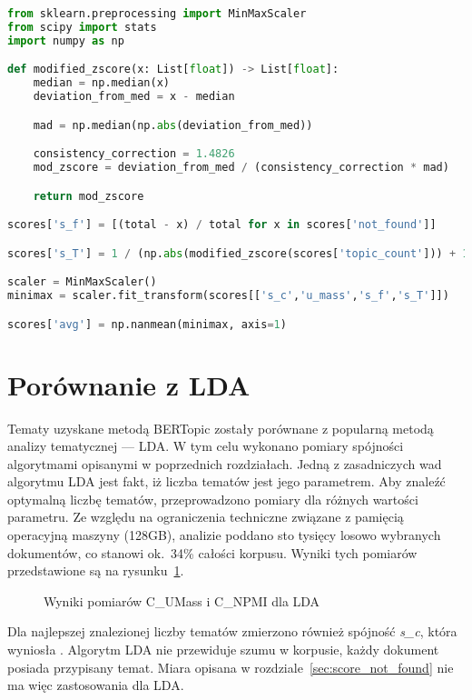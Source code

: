 		\begin{lstlisting}[label=lst:final_score,language=Python,caption=Obliczanie finalnej oceny spójności tematów dla listy modeli]
from sklearn.preprocessing import MinMaxScaler
from scipy import stats
import numpy as np

def modified_zscore(x: List[float]) -> List[float]:
	median = np.median(x)
	deviation_from_med = x - median

	mad = np.median(np.abs(deviation_from_med))

	consistency_correction = 1.4826
	mod_zscore = deviation_from_med / (consistency_correction * mad)

	return mod_zscore

scores['s_f'] = [(total - x) / total for x in scores['not_found']]

scores['s_T'] = 1 / (np.abs(modified_zscore(scores['topic_count'])) + 1)

scaler = MinMaxScaler()
minimax = scaler.fit_transform(scores[['s_c','u_mass','s_f','s_T']])

scores['avg'] = np.nanmean(minimax, axis=1)
		\end{lstlisting}

\section{Porównanie z LDA}
	Tematy uzyskane metodą BERTopic zostały porównane z popularną metodą analizy tematycznej --- LDA\@.
	W tym celu wykonano pomiary spójności algorytmami opisanymi w poprzednich rozdziałach.
	Jedną z zasadniczych wad algorytmu LDA jest fakt, iż liczba tematów jest jego parametrem.
	Aby znaleźć optymalną liczbę tematów, przeprowadzono pomiary dla różnych wartości parametru.
	Ze względu na ograniczenia techniczne związane z pamięcią operacyjną maszyny (128GB), analizie poddano sto tysięcy losowo wybranych dokumentów,
		co stanowi ok.~34\% całości korpusu.
	Wyniki tych pomiarów przedstawione są na rysunku~\ref{fig:lda_scores}.

	\begin{figure}[htb]
		\centering
		\caption{Wyniki pomiarów C\_UMass i C\_NPMI dla LDA}\label{fig:lda_scores}
	\end{figure}

	Dla najlepszej znalezionej liczby tematów zmierzono również spójność \emph{s\_c}, która wyniosła .
	Algorytm LDA nie przewiduje szumu w korpusie, każdy dokument posiada przypisany temat.
	Miara opisana w rozdziale~\ref{sec:score_not_found} nie ma więc zastosowania dla LDA\@.